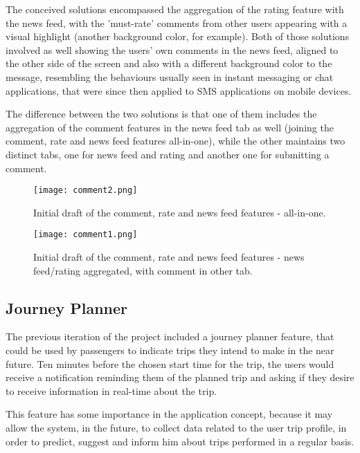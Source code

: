 The conceived solutions encompassed the aggregation of the rating feature with the news feed, with the 'must-rate' comments from other users appearing with a visual highlight (another background color, for example).
Both of those solutions involved as well showing the users' own comments in the news feed, aligned to the other side of the screen and also with a different background color to the message, resembling the behaviours usually seen in instant messaging or chat applications, that were since then applied to SMS applications on mobile devices.

The difference between the two solutions is that one of them includes the aggregation of the comment features in the news feed tab as well (joining the comment, rate and news feed features all-in-one), while the other maintains two distinct tabs, one for news feed and rating and another one for submitting a comment.

\begin{figure}[h!]
  \begin{center}
    \leavevmode
    \texttt{[image: comment2.png]}
    \caption{Initial draft of the comment, rate and news feed features - all-in-one.}
    \label{fig:comment2}
  \end{center}
\end{figure}

\begin{figure}[h!]
  \begin{center}
    \leavevmode
    \texttt{[image: comment1.png]}
    \caption{Initial draft of the comment, rate and news feed features - news feed/rating aggregated, with comment in other tab.}
    \label{fig:comment1}
  \end{center}
\end{figure}

\subsection{Journey Planner}\label{jourplaninit}

The previous iteration of the project included a journey planner feature, that could be used by passengers to indicate trips they intend to make in the near future. Ten minutes before the chosen start time for the trip, the users would receive a notification reminding them of the planned trip and asking if they desire to receive information in real-time about the trip.

This feature has some importance in the application concept, because it may allow the system, in the future, to collect data related to the user trip profile, in order to predict, suggest and inform him about trips performed in a regular basis.

